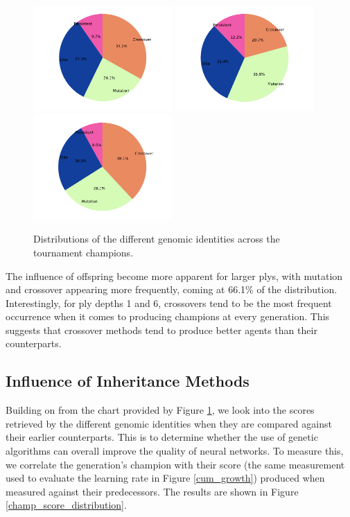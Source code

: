 \documentclass[12pt,a4paper]{article}
\begin{document}
        \begin{figure}[!ht]
            \centering
            \includegraphics[width=53mm]{images/results/1ply/champ_gen_dist.pdf}
            \includegraphics[width=53mm]{images/results/3ply/champ_gen_dist.pdf}
            \includegraphics[width=53mm]{images/results/6ply/champ_gen_dist.pdf}
            \caption{Distributions of the different genomic identities across the tournament champions. \label{champ_gen_dist}}
        \end{figure}

        The influence of offspring become more apparent for larger plys, with mutation and crossover appearing more frequently, coming at 66.1\% of the distribution. Interestingly, for ply depths 1 and 6, crossovers tend to be the most frequent occurrence when it comes to producing champions at every generation. This suggests that crossover methods tend to produce better agents than their counterparts.

    \subsection{Influence of Inheritance Methods}
        Building on from the chart provided by Figure \ref{champ_gen_dist}, we look into the scores retrieved by the different genomic identities when they are compared against their earlier counterparts. This is to determine whether the use of genetic algorithms can overall improve the quality of neural networks. To measure this, we correlate the generation's champion with their score (the same measurement used to evaluate the learning rate in Figure \ref{cum_growth}) produced when measured against their predecessors. The results are shown in Figure \ref{champ_score_distribution}.
\end{document}
